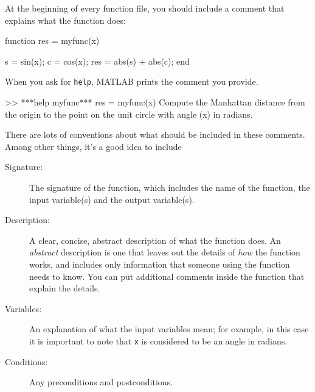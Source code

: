
At the beginning of every function file, you should include a comment
that explains what the function does:


\begin{code}

function res = myfunc(x)

    s = sin(x);
    c = cos(x);
    res = abs(s) + abs(c);
end
\end{code}

When you ask for {\tt help}, MATLAB prints the comment you provide.


\begin{code}
>> ***help myfunc***
  res = myfunc(x)
  Compute the Manhattan distance from the origin to the
  point on the unit circle with angle (x) in radians.
\end{code}

There are lots of conventions about what should be included
in these comments.  Among other things, it's a good idea to
include

\begin{description}

\item [Signature:] The signature of the function, which includes the name
of the function, the input variable(s) and the output variable(s).

\item [Description:] A clear, concise, abstract description of what the function does.
An {\em abstract} description is one that leaves out the
details of {\em how} the function works, and includes only information
that someone using the function needs to know.  You can put additional
comments inside the function that explain the details.

\item [Variables:] An explanation of what the input variables mean; for example,
in this case it is important to note that {\tt x} is considered
to be an angle in radians.

\item [Conditions:] Any preconditions and postconditions.

\end{description}

